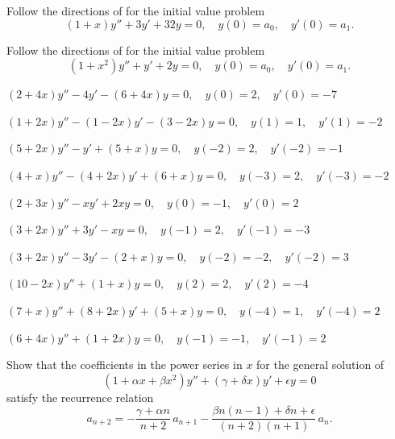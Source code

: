 \begin{exerciselist}
\item\label{exer:7.3.17}\Lex
Follow the directions of  for the
initial value problem
\[
(1+x)y''+3y'+32y=0,\quad y(0)=a_0,\quad y'(0)=a_1.
\]

\item\label{exer:7.3.18}\Lex
Follow the directions of  for the initial
value problem
\[
(1+x^2)y''+y'+2y=0,\quad y(0)=a_0,\quad y'(0)=a_1.
\]




\item\label{exer:7.3.19}\Cex
$(2+4x)y''-4y'-(6+4x)y=0,\quad y(0)=2,\quad y'(0)=-7$

\item\label{exer:7.3.20}\Cex
$(1+2x)y''-(1-2x)y'-(3-2x)y=0,\quad y(1)=1,\quad y'(1)=-2$

\item\label{exer:7.3.21}\Cex
$(5+2x)y''-y'+(5+x)y=0,\quad y(-2)=2,\quad y'(-2)=-1$

\item\label{exer:7.3.22}\Cex
$(4+x)y''-(4+2x)y'+(6+x)y=0,\quad y(-3)=2,\quad y'(-3)=-2$

\item\label{exer:7.3.23}\Cex
$(2+3x)y''-xy'+2xy=0,\quad y(0)=-1,\quad y'(0)=2$

\item\label{exer:7.3.24}\Cex
$(3+2x)y''+3y'-xy=0,\quad y(-1)=2,\quad y'(-1)=-3$

\item\label{exer:7.3.25}\Cex
$(3+2x)y''-3y'-(2+x)y=0,\quad y(-2)=-2,\quad y'(-2)=3$

\item\label{exer:7.3.26}\Cex
$(10-2x)y''+(1+x)y=0,\quad y(2)=2,\quad y'(2)=-4$

\item\label{exer:7.3.27}\Cex
$(7+x)y''+(8+2x)y'+(5+x)y=0,\quad y(-4)=1,\quad y'(-4)=2$

\item\label{exer:7.3.28}\Cex
$(6+4x)y''+(1+2x)y=0,\quad y(-1)=-1,\quad y'(-1)=2$


\item\label{exer:7.3.29}Show that the coefficients in the power series in $x$  for the general
solution of
\[
(1+\alpha x+\beta x^2)y''+(\gamma+\delta x)y'+\epsilon y=0
\]
satisfy the recurrence relation
\[
a_{n+2}=-\frac{\gamma+\alpha n}{n+2}\,a_{n+1}-\frac{\beta n(n-1)+\delta
n+\epsilon}{(n+2)(n+1)}\, a_n.
\]



\end{exerciselist}
